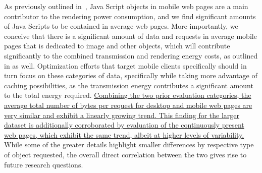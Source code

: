 \documentclass[onecolumn,12pt]{IEEEtran}
\begin{document}
%
%
As previously outlined in~\cite{ThAgNiBoSi12}, Java Script objects in mobile web pages are a main contributor to the rendering power consumption, and we find significant amounts of Java Scripts to be contained in average web pages.
More importantly, we conceive that there is a significant amount of data and requests in average mobile pages that is dedicated to image and other objects, which will contribute significantly to the combined transmission and rendering energy costs, as outlined in \cite{ThAgNiBoSi12} as well.
Optimization efforts that target mobile clients specifically should in turn focus on these categories of data, specifically while taking more advantage of caching possibilities, as the transmission energy contributes a significant amount to the total energy required.
%
%
\uline{Combining the two prior evaluation categories, the average total number of bytes per request for desktop and mobile web pages are very similar and exhibit a linearly growing trend.
	This finding for the larger dataset is additionally corroborated by evaluation of the continuously present web pages, which exhibit the same trend, albeit at higher levels of variability.}
While some of the greater details highlight smaller differences by respective type of object requested, the overall direct correlation between the two gives rise to future research questions.
%
%
\end{document}
